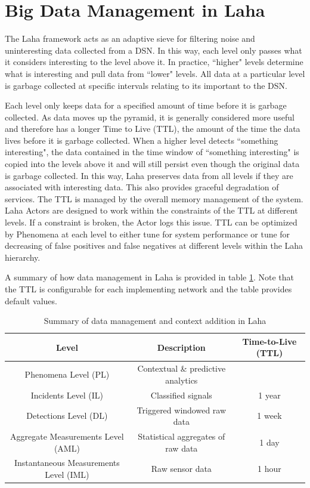 \section{Big Data Management in Laha} \label{big-data-management}
The Laha framework acts as an adaptive sieve for filtering noise and uninteresting data collected from a DSN. In this way, each level only passes what it considers interesting to the level above it. In practice, ``higher" levels determine what is interesting and pull data from ``lower" levels. All data at a particular level is garbage collected at specific intervals relating to its important to the DSN.

Each level only keeps data for a specified amount of time before it is garbage collected. As data moves up the pyramid, it is generally considered more useful and therefore has a longer Time to Live (TTL), the amount of the time the data lives before it is garbage collected.  When a higher level detects ``something interesting", the data contained in the time window of ``something interesting" is copied into the levels above it and will still persist even though the original data is garbage collected. In this way, Laha preserves data from all levels if they are associated with interesting data. This also provides graceful degradation of services. The TTL is managed by the overall memory management of the system. Laha Actors are designed to work within the constraints of the TTL at different levels. If a constraint is broken, the Actor logs this issue. TTL can be optimized by Phenomena at each level to either tune for system performance or tune for decreasing of false positives and false negatives at different levels within the Laha hierarchy.

A summary of how data management in Laha is provided in table \ref{data-managament-table}. Note that the TTL is configurable for each implementing network and the table provides default values.

\begin{table}
	\caption{Summary of data management and context addition in Laha}
	\begin{tabular}{|c|c|c|}
		\hline 
		Level & Description & Time-to-Live (TTL) \\ 
		\hline 
		Phenomena Level (PL) & Contextual \& predictive analytics &  \\ 
		\hline 
		Incidents Level (IL) & Classified signals &  1 year \\ 
		\hline 
		Detections Level (DL) & Triggered windowed raw data & 1 week  \\ 
		\hline 
		Aggregate Measurements Level (AML) & Statistical aggregates of raw data  & 1 day  \\ 
		\hline 
		Instantaneous Measurements Level (IML) & Raw sensor data  & 1 hour \\ 
		\hline 
	\end{tabular} 
    \label{data-managament-table}
\end{table}

